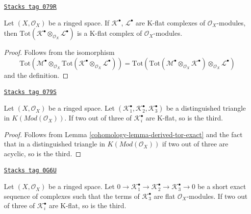 \begin{lemma}
\label{cohomology-lemma-tensor-product-K-flat}
\href{https://stacks.math.columbia.edu/tag/079R}{\texttt{Stacks tag 079R}}

Let $(X, \mathcal{O}_X)$ be a ringed space.
If $\mathcal{K}^\bullet$, $\mathcal{L}^\bullet$ are K-flat complexes
of $\mathcal{O}_X$-modules, then
$\text{Tot}(\mathcal{K}^\bullet \otimes_{\mathcal{O}_X} \mathcal{L}^\bullet)$
is a K-flat complex of $\mathcal{O}_X$-modules.
\end{lemma}

\begin{proof}
Follows from the isomorphism
$$
\text{Tot}(\mathcal{M}^\bullet \otimes_{\mathcal{O}_X}
\text{Tot}(\mathcal{K}^\bullet \otimes_{\mathcal{O}_X} \mathcal{L}^\bullet))
=
\text{Tot}(\text{Tot}(\mathcal{M}^\bullet \otimes_{\mathcal{O}_X}
\mathcal{K}^\bullet) \otimes_{\mathcal{O}_X} \mathcal{L}^\bullet)
$$
and the definition.
\end{proof}

\begin{lemma}
\label{cohomology-lemma-K-flat-two-out-of-three}
\href{https://stacks.math.columbia.edu/tag/079S}{\texttt{Stacks tag 079S}}

Let $(X, \mathcal{O}_X)$ be a ringed space.
Let $(\mathcal{K}_1^\bullet, \mathcal{K}_2^\bullet, \mathcal{K}_3^\bullet)$
be a distinguished triangle in $K(\textit{Mod}(\mathcal{O}_X))$.
If two out of three of $\mathcal{K}_i^\bullet$ are K-flat, so is the third.
\end{lemma}

\begin{proof}

Follows from
Lemma \ref{cohomology-lemma-derived-tor-exact}
and the fact that in a distinguished triangle in
$K(\textit{Mod}(\mathcal{O}_X))$
if two out of three are acyclic, so is the third.
\end{proof}

\begin{lemma}
\label{cohomology-lemma-K-flat-two-out-of-three-ses}
\href{https://stacks.math.columbia.edu/tag/0G6U}{\texttt{Stacks tag 0G6U}}

Let $(X, \mathcal{O}_X)$ be a ringed space. Let
$0 \to \mathcal{K}_1^\bullet \to \mathcal{K}_2^\bullet \to
\mathcal{K}_3^\bullet \to 0$ be a short exact sequence of complexes
such that the terms of $\mathcal{K}_3^\bullet$ are flat $\mathcal{O}_X$-modules.
If two out of three of $\mathcal{K}_i^\bullet$ are K-flat, so is the third.
\end{lemma}

